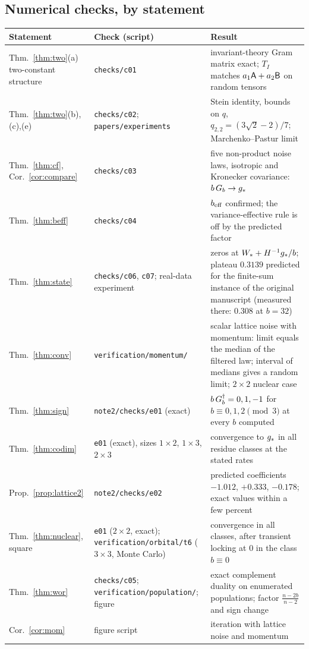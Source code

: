 \subsection{Numerical checks, by statement}
{\small
\begin{longtable}{@{}p{}p{}p{}@{}}
\toprule
Statement & Check (script) & Result\\
\midrule
\endhead
Thm.~\ref{thm:two}(a) two-constant structure & \texttt{checks/c01} & invariant-theory Gram matrix exact; $T_I$ matches $a_1\mathsf{A}+a_2\mathsf{B}$ on random tensors\\
Thm.~\ref{thm:two}(b),(c),(e) & \texttt{checks/c02}; \texttt{papers/experiments} & Stein identity, bounds on $q$, $q_{2,2}=(3\sqrt2-2)/7$; Marchenko--Pastur limit\\
Thm.~\ref{thm:cf}, Cor.~\ref{cor:compare} & \texttt{checks/c03} & five non-product noise laws, isotropic and Kronecker covariance: $b\,G_b\to g_\ast$\\
Thm.~\ref{thm:beff} & \texttt{checks/c04} & $b_{\mathrm{eff}}$ confirmed; the variance-effective rule is off by the predicted factor\\
Thm.~\ref{thm:state} & \texttt{checks/c06}, \texttt{c07}; real-data experiment & zeros at $W_\ast+H^{-1}g_\ast/b$; plateau $0.3139$ predicted for the finite-sum instance of the original manuscript (measured there: $0.308$ at $b=32$)\\
Thm.~\ref{thm:conv} & \texttt{verification/momentum/} & scalar lattice noise with momentum: limit equals the median of the filtered law; interval of medians gives a random limit; $2\times2$ nuclear case\\
Thm.~\ref{thm:sign} & \texttt{note2/checks/e01} (exact) & $b\,G_b^\dagger=0,1,-1$ for $b\equiv0,1,2\pmod3$ at every $b$ computed\\
Thm.~\ref{thm:codim} & \texttt{e01} (exact), sizes $1\times2$, $1\times3$, $2\times3$ & convergence to $g_\ast$ in all residue classes at the stated rates\\
Prop.~\ref{prop:lattice2} & \texttt{note2/checks/e02} & predicted coefficients $-1.012$, $+0.333$, $-0.178$; exact values within a few percent\\
Thm.~\ref{thm:nuclear}, square & \texttt{e01} ($2\times2$, exact); \texttt{verification/orbital/t6} ($3\times3$, Monte Carlo) & convergence in all classes, after transient locking at $0$ in the class $b\equiv0$\\
Thm.~\ref{thm:wor} & \texttt{checks/c05}; \texttt{verification/population/}; figure & exact complement duality on enumerated populations; factor $\frac{n-2b}{n-2}$ and sign change\\
Cor.~\ref{cor:mom} & figure script & iteration with lattice noise and momentum\\
\bottomrule
\end{longtable}}

